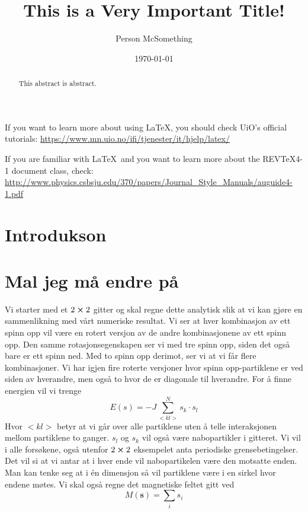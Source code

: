 \documentclass[reprint,english,notitlepage]{revtex4-1}  %
\begin{document}
\title{This is a Very Important Title!}   %
\author{Person McSomething}               %
\date{\today}                             %
\noaffiliation                            %
\begin{abstract}                          %
This abstract is abstract.                %
\end{abstract}                            %
\maketitle                                %

If you want to learn more about using \LaTeX, you should check UiO's official tutorials:
\url{https://www.mn.uio.no/ifi/tjenester/it/hjelp/latex/}

If you are familiar with \LaTeX\ and you want to learn more about the REVTeX4-1 document class, check:
\url{http://www.physics.csbsju.edu/370/papers/Journal_Style_Manuals/auguide4-1.pdf}


\section{Introdukson}

\section{Mal jeg må endre på}
Vi starter med et $2\cross 2$ gitter og skal regne dette analytisk slik at vi kan gjøre en sammenlikning med vårt numeriske resultat. Vi ser at hver kombinasjon av ett spinn opp vil være en rotert versjon av de andre kombinasjonene av ett spinn opp. Den samme rotasjonsegenskapen ser vi med tre spinn opp, siden det også bare er ett spinn ned. Med to spinn opp derimot, ser vi at vi får flere kombinasjoner. Vi har igjen fire roterte versjoner hvor spinn opp-partiklene er ved siden av hverandre, men også to hvor de er diagonale til hverandre.
For å finne energien vil vi trenge
$$
E(s)=-J\sum_{<kl>}^N s_k \cdot s_l
$$
Hvor $<kl>$ betyr at vi går over alle partiklene uten å telle interaksjonen mellom partiklene to ganger. $s_l$ og $s_k$ vil også være nabopartikler i gitteret. Vi vil i alle forsøkene, også utenfor $2\cross 2$ eksempelet anta periodiske grensebetingelser. Det vil si at vi antar at i hver ende vil nabopartikelen være den motsatte enden. Man kan tenke seg at i én dimensjon så vil partiklene være i en sirkel hvor endene møtes.
\newline 
Vi skal også regne det magnetiske feltet gitt ved
$$
M(\mathbf{s})=\sum_i s_i
$$
\end{document}
